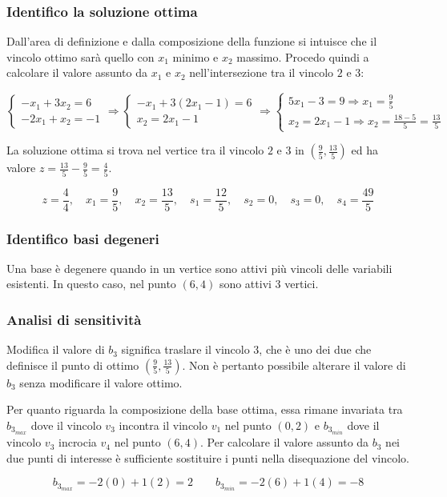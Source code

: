 \documentclass[\main/main.tex]{subfiles}
\begin{document}
\subsubsection*{Identifico la soluzione ottima}
Dall'area di definizione e dalla composizione della funzione si intuisce che il vincolo ottimo sarà quello con $x_1$ minimo e $x_2$ massimo. Procedo quindi a calcolare il valore assunto da $x_1$ e $x_2$ nell'intersezione tra il vincolo $2$ e $3$:

\[
  \begin{cases}
    -x_1 + 3x_2  = 6 \\
    -2x_1 + x_2  = -1
  \end{cases}
  \Rightarrow
  \begin{cases}
    -x_1 + 3(2x_1 -1)  = 6 \\
    x_2  =2x_1 -1
  \end{cases}
  \Rightarrow
  \begin{cases}
    5x_1 -3  = 9 \Rightarrow x_1 = \frac{9}{5} \\
    x_2  =2x_1 -1 \Rightarrow x_2 = \frac{18-5}{5} = \frac{13}{5}
  \end{cases}
\]

La soluzione ottima si trova nel vertice tra il vincolo $2$ e $3$ in $(\frac{9}{5}, \frac{13}{5})$ ed ha valore $z = \frac{13}{5} - \frac{9}{5} = \frac{4}{5}$.

\[
  z = \frac{4}{4}, \quad x_1 = \frac{9}{5}, \quad x_2 = \frac{13}{5}, \quad s_1 = \frac{12}{5}, \quad s_2 = 0, \quad s_3 = 0, \quad s_4 = \frac{49}{5}
\]

\subsubsection*{Identifico basi degeneri}
Una base è degenere quando in un vertice sono attivi più vincoli delle variabili esistenti. In questo caso, nel punto $(6,4)$ sono attivi 3 vertici.

\subsubsection*{Analisi di sensitività}
Modifica il valore di $b_3$ significa traslare il vincolo $3$, che è uno dei due che definisce il punto di ottimo $(\frac{9}{5}, \frac{13}{5})$. Non è pertanto possibile alterare il valore di $b_3$ senza modificare il valore ottimo.

Per quanto riguarda la composizione della base ottima, essa rimane invariata tra $b_{3_{max}}$ dove il vincolo $v_3$ incontra il vincolo $v_1$ nel punto $(0,2)$ e $b_{3_{min}}$ dove il vincolo $v_3$ incrocia $v_4$ nel punto $(6,4)$. Per calcolare il valore assunto da $b_3$ nei due punti di interesse è sufficiente sostituire i punti nella disequazione del vincolo.

\[
  b_{3_{max}} = -2(0) + 1(2) = 2 \qquad b_{3_{min}} = -2(6) + 1(4) = -8
\]
\end{document}

